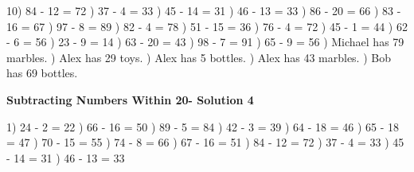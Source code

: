 \documentclass{article}%
\begin{document}
10) 84 {-} 12 = 72%
) 37 {-} 4 = 33%
) 45 {-} 14 = 31%
) 46 {-} 13 = 33%
) 86 {-} 20 = 66%
) 83 {-} 16 = 67%
) 97 {-} 8 = 89%
) 82 {-} 4 = 78%
) 51 {-} 15 = 36%
) 76 {-} 4 = 72%
) 45 {-} 1 = 44%
) 62 {-} 6 = 56%
) 23 {-} 9 = 14%
) 63 {-} 20 = 43%
) 98 {-} 7 = 91%
) 65 {-} 9 = 56%
) Michael has 79 marbles.%
) Alex has 29 toys.%
) Alex has 5 bottles.%
) Alex has 43 marbles.%
) Bob has 69 bottles.%
\newline%
\newpage%
\large%
\begin{center}%
\textbf{Subtracting Numbers Within 20- Solution 4}%
\newline%
\end{center} \normalsize%
1) 24 {-} 2 = 22%
) 66 {-} 16 = 50%
) 89 {-} 5 = 84%
) 42 {-} 3 = 39%
) 64 {-} 18 = 46%
) 65 {-} 18 = 47%
) 70 {-} 15 = 55%
) 74 {-} 8 = 66%
) 67 {-} 16 = 51%
) 84 {-} 12 = 72%
) 37 {-} 4 = 33%
) 45 {-} 14 = 31%
) 46 {-} 13 = 33%
\newline%
\end{document}
